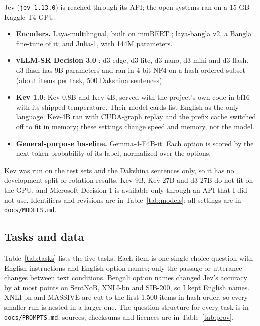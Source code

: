 \documentclass[11pt]{article}
\begin{document}
Jev (\texttt{jev-1.13.0}) is reached through its API; the open systems ran on a 15 GB Kaggle T4 GPU.
\begin{itemize}
\item \textbf{Encoders.} Laya-multilingual, built on mmBERT \citep{marone2025mmbert}; laya-bangla v2, a Bangla fine-tune of it; and Julia-1, with 144M parameters.
\item \textbf{vLLM-SR Decision 3.0} \citep{liu2026vllmsr}: d3-edge, d3-lite, d3-nano, d3-mini and d3-flash. d3-flash has 9B parameters and ran in 4-bit NF4 on a hash-ordered subset (about \flashNmax{} items per task, 500 Dakshina sentences).
\item \textbf{Kev 1.0}: Kev-0.8B and Kev-4B, served with the project's own code in bf16 with its shipped temperature. Their model cards list English as the only language. Kev-4B ran with CUDA-graph replay and the prefix cache switched off to fit in memory; these settings change speed and memory, not the model.
\item \textbf{General-purpose baseline.} Gemma-4-E4B-it. Each option is scored by the next-token probability of its label, normalized over the options.
\end{itemize}
Kev was run on the test sets and the Dakshina sentences only, so it has no development-split or rotation results.
Kev-9B, Kev-27B and d3-27B do not fit on the GPU, and Microsoft-Decision-1 is available only through an API that I did not use.
Identifiers and revisions are in Table~\ref{tab:models}; all settings are in \texttt{docs/MODELS.md}.

\subsection{Tasks and data}
Table~\ref{tab:tasks} lists the five tasks.
Each item is one single-choice question with English instructions and English option names; only the passage or utterance changes between text conditions.
Bengali option names changed Jev's accuracy by at most  points on SentNoB, XNLI-bn and SIB-200, so I kept English names.
XNLI-bn and MASSIVE are cut to the first 1,500 items in hash order, so every smaller run is nested in a larger one.
The question structure for every task is in \texttt{docs/PROMPTS.md}; sources, checksums and licences are in Table~\ref{tab:prov}.
\begin{table}[t]
\centering\footnotesize
\resizebox{\linewidth}{!}{}
\caption{Tasks. XNLI-bn is a machine translation of XNLI, and MASSIVE and the FLORES-based sets are human translations, so SentNoB is the only native Bengali text. MASSIVE is posed with all 60 intents; its test items use 59 of them.}
\label{tab:tasks}
\end{table}
\end{document}
